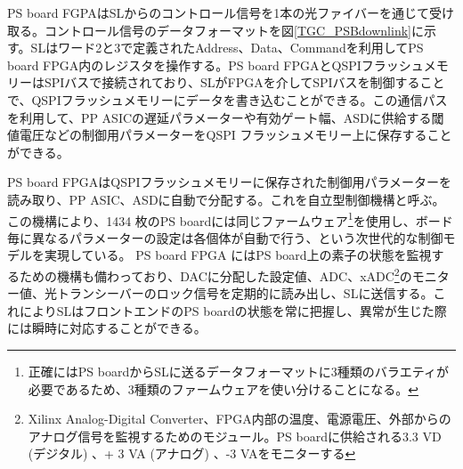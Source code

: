     PS board FGPAはSLからのコントロール信号を1本の光ファイバーを通じて受け取る。コントロール信号のデータフォーマットを図\ref{TGC_PSBdownlink}に示す。SLはワード2と3で定義されたAddress、Data、Commandを利用してPS board FPGA内のレジスタを操作する。PS board FPGAとQSPIフラッシュメモリーはSPIバスで接続されており、SLがFPGAを介してSPIバスを制御することで、QSPIフラッシュメモリーにデータを書き込むことができる。この通信パスを利用して、PP ASICの遅延パラメーターや有効ゲート幅、ASDに供給する閾値電圧などの制御用パラメーターをQSPI フラッシュメモリー上に保存することができる。

    PS board FPGAはQSPIフラッシュメモリーに保存された制御用パラメーターを読み取り、PP ASIC、ASDに自動で分配する。これを自立型制御機構と呼ぶ。この機構により、1434 枚のPS boardには同じファームウェア\footnote{正確にはPS boardからSLに送るデータフォーマットに3種類のバラエティが必要であるため、3種類のファームウェアを使い分けることになる。}を使用し、ボード毎に異なるパラメーターの設定は各個体が自動で行う、という次世代的な制御モデルを実現している。
    PS board FPGA にはPS board上の素子の状態を監視するための機構も備わっており、DACに分配した設定値、ADC、xADC\footnote{Xilinx Analog-Digital Converter、FPGA内部の温度、電源電圧、外部からのアナログ信号を監視するためのモジュール。PS boardに供給される3.3 VD  (デジタル) 、+ 3 VA  (アナログ) 、-3 VAをモニターする}のモニター値、光トランシーバーのロック信号を定期的に読み出し、SLに送信する。これによりSLはフロントエンドのPS boardの状態を常に把握し、異常が生じた際には瞬時に対応することができる。

